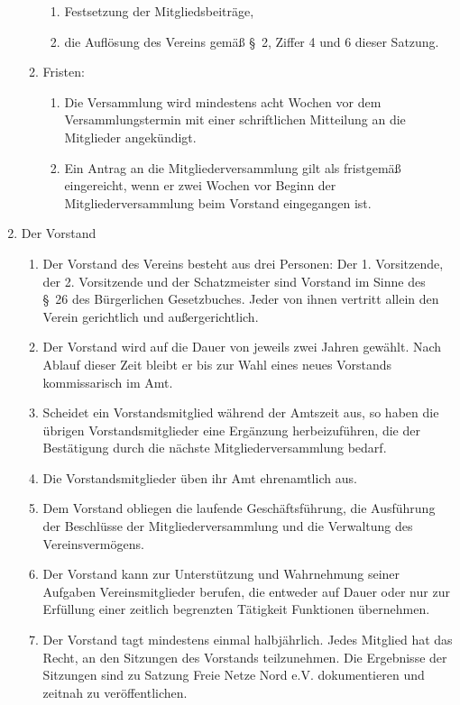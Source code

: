 \documentclass[12pt,a4paper]{article}
\newcommand{\Verein}{Freie Netze Nord} %
\begin{document}
\begin{enumerate}
\begin{enumerate}
\begin{enumerate}
\item Festsetzung der Mitgliedsbeiträge, 
\item die Auflösung des Vereins gemäß §~2, Ziffer 4 und 6 dieser Satzung.
\end{enumerate}
\item Fristen: 
\begin{enumerate}
\item Die Versammlung wird mindestens acht Wochen vor dem Versammlungstermin mit einer schriftlichen Mitteilung an die Mitglieder angekündigt.
\item Ein Antrag an die Mitgliederversammlung gilt als fristgemäß eingereicht, wenn er zwei Wochen vor Beginn der Mitgliederversammlung beim Vorstand eingegangen ist.
\end{enumerate}
\end{enumerate}
\item Der Vorstand
\begin{enumerate}
\item Der Vorstand des Vereins besteht aus drei Personen: Der 1. Vorsitzende, der 2. Vorsitzende und der Schatzmeister sind Vorstand im Sinne des §~26 des Bürgerlichen Gesetzbuches. Jeder von ihnen vertritt allein den Verein gerichtlich und außergerichtlich.
\item Der Vorstand wird auf die Dauer von jeweils zwei Jahren gewählt. Nach Ablauf dieser Zeit bleibt er bis zur Wahl eines neues Vorstands kommissarisch im Amt.
\item Scheidet ein Vorstandsmitglied während der Amtszeit aus, so haben die übrigen Vorstandsmitglieder eine Ergänzung herbeizuführen, die der Bestätigung durch die nächste Mitgliederversammlung bedarf.
\item Die Vorstandsmitglieder üben ihr Amt ehrenamtlich aus.
\item Dem Vorstand obliegen die laufende Geschäftsführung, die Ausführung der Beschlüsse der Mitgliederversammlung und die Verwaltung des Vereinsvermögens.
\item Der Vorstand kann zur Unterstützung und Wahrnehmung seiner Aufgaben Vereinsmitglieder berufen, die entweder auf Dauer oder nur zur Erfüllung einer zeitlich begrenzten Tätigkeit Funktionen übernehmen.
\item Der Vorstand tagt mindestens einmal halbjährlich. Jedes Mitglied hat das Recht, an den Sitzungen des Vorstands teilzunehmen. Die Ergebnisse der Sitzungen sind zu Satzung {\Verein} e.V. dokumentieren und zeitnah zu veröffentlichen.
\end{enumerate}
\end{enumerate}
\end{document}
